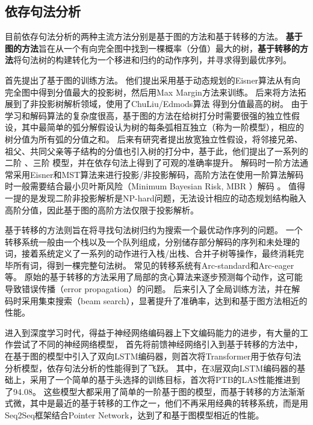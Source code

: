 \subsection{依存句法分析}

目前依存句法分析的两种主流方法分别是基于图的方法和基于转移的方法。
\textbf{基于图的方法}旨在从一个有向完全图中找到一棵概率（分值）最大的树，\textbf{基于转移的方法}将句法树的构建转化为一个移进和归约的动作序列，并寻求得到最优序列。

\citet{mcdonald-etal-2005-online}首先提出了基于图的训练方法。
他们提出采用基于动态规划的Eisner算法从有向完全图中得到分值最大的投影树，然后用Max Margin方法来训练。
后来\citet{mcdonald-etal-2005-non}将方法拓展到了非投影树解析领域，使用了ChuLiu/Edmods算法 \citep{chu-1965-shortest}得到分值最高的树。
由于学习和解码算法的复杂度很高，基于图的方法在给树打分时需要很强的独立性假设，其中最简单的弧分解假设认为树的每条弧相互独立（称为一阶模型），相应的树分值为所有弧的分值之和。
后来有研究者提出放宽独立性假设，将邻接兄弟、祖父、共同父亲等子结构的分值也引入树的打分中，基于此，他们提出了一系列的二阶 \citep{mcdonald-pereira-2006-online,carreras-2007-experiments}、三阶 \citep{koo-collins-2010-efficient}模型，并在依存句法上得到了可观的准确率提升。
解码时一阶方法通常采用Eisner和MST算法来进行投影/非投影解码，高阶方法在使用一阶算法解码时一般需要结合最小贝叶斯风险（Minimum Bayesian Risk, MBR ）解码 \citep{smith-smith-2007-probabilistic}。
值得一提的是\citet{mcdonald-pereira-2006-online}发现二阶非投影解析是NP-hard问题，无法设计相应的动态规划结构融入高阶分值，因此基于图的高阶方法仅限于投影解析。

基于转移的方法则旨在将寻找句法树归约为搜索一个最优动作序列的问题。
一个转移系统一般由一个栈以及一个队列组成，分别储存部分解码的序列和未处理的词，接着系统定义了一系列的动作进行入栈/出栈、合并子树等操作，最终消耗完毕所有词，得到一棵完整句法树。
常见的转移系统有Arc-standard和Arc-eager等。
原始的基于转移的方法采用了局部的贪心算法来逐步预测每个动作，这可能导致错误传播（error propagation）的问题。
后来\citet{zhang-clark-2008-tale,huang-etal-2009-bilingually}引入了全局训练方法，并在解码时采用集束搜索（beam search），显著提升了准确率，达到和基于图方法相近的性能。

进入到深度学习时代，得益于神经网络编码器上下文编码能力的进步，有大量的工作尝试了不同的神经网络模型，
\citet{chen-manning-2014-fast}首先将前馈神经网络引入到基于转移的方法中，\citet{kiperwasser-goldberg-2016-simple,wang-chang-2016-graph}在基于图的模型中引入了双向LSTM编码器，\citet{li-etal-2019-attentive}则首次将Transformer用于依存句法分析模型，依存句法分析的性能得到了飞跃。
其中，\citet{dozat-etal-2017-biaffine}在3层双向LSTM编码器的基础上，采用了一个简单的基于头选择的训练目标，首次将PTB的LAS性能推进到了94.08。
这些模型大都采用了简单的一阶基于图的模型，而基于转移的方法渐渐式微，其中\citet{ma-etal-2018-stack}是最近的基于转移的工作之一，他们不再采用经典的转移系统，而是用Seq2Seq框架结合Pointer Network，达到了和基于图模型相近的性能。

